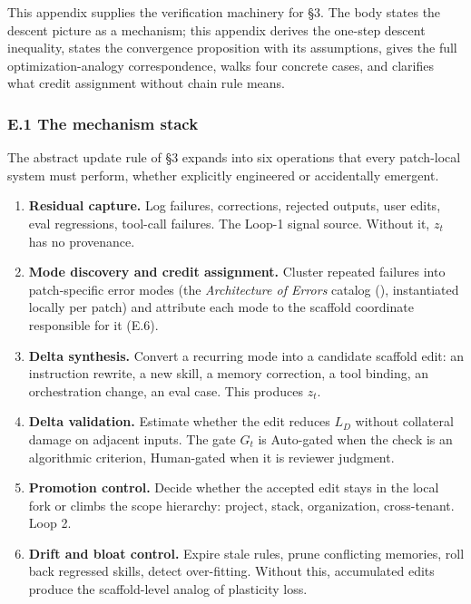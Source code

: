 \documentclass[
]{article}
\providecommand{\tightlist}{%
  \setlength{\itemsep}{0pt}\setlength{\parskip}{0pt}}
\begin{document}
This appendix supplies the verification machinery for §3. The body
states the descent picture as a mechanism; this appendix derives the
one-step descent inequality, states the convergence proposition with its
assumptions, gives the full optimization-analogy correspondence, walks
four concrete cases, and clarifies what credit assignment without chain
rule means.

\subsubsection{E.1 The mechanism stack}\label{e.1-the-mechanism-stack}

The abstract update rule of §3 expands into six operations that every
patch-local system must perform, whether explicitly engineered or
accidentally emergent.

\begin{enumerate}
\def\labelenumi{\arabic{enumi}.}
\tightlist
\item
  \textbf{Residual capture.} Log failures, corrections, rejected
  outputs, user edits, eval regressions, tool-call failures. The Loop-1
  signal source. Without it, \(z_t\) has no provenance.
\item
  \textbf{Mode discovery and credit assignment.} Cluster repeated
  failures into patch-specific error modes (the \emph{Architecture of
  Errors} catalog (), instantiated locally per patch) and attribute each mode to the
  scaffold coordinate responsible for it (E.6).
\item
  \textbf{Delta synthesis.} Convert a recurring mode into a candidate
  scaffold edit: an instruction rewrite, a new skill, a memory
  correction, a tool binding, an orchestration change, an eval case.
  This produces \(z_t\).
\item
  \textbf{Delta validation.} Estimate whether the edit reduces \(L_D\)
  without collateral damage on adjacent inputs. The gate \(G_t\) is
  Auto-gated when the check is an algorithmic criterion, Human-gated
  when it is reviewer judgment.
\item
  \textbf{Promotion control.} Decide whether the accepted edit stays in
  the local fork or climbs the scope hierarchy: project, stack,
  organization, cross-tenant. Loop 2.
\item
  \textbf{Drift and bloat control.} Expire stale rules, prune
  conflicting memories, roll back regressed skills, detect over-fitting.
  Without this, accumulated edits produce the scaffold-level analog of
  plasticity loss.
\end{enumerate}
\end{document}
